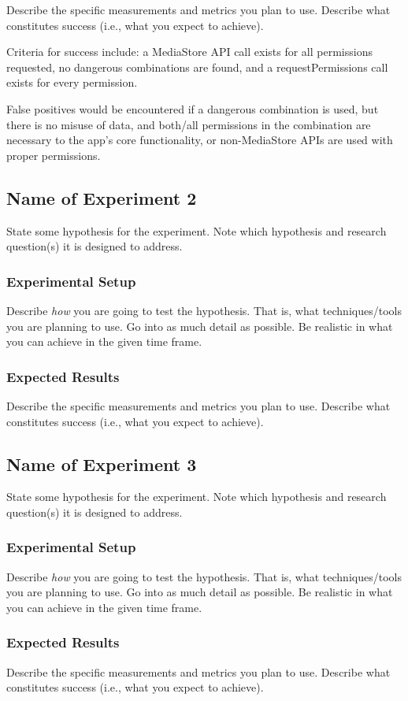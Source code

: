 \documentclass[10pt,twocolumn,pdftex]{article}
\begin{document}
    Describe the specific measurements and metrics you plan to use. Describe
    what constitutes success (i.e., what you expect to achieve).

    Criteria for success include:
    a MediaStore API call exists for all permissions requested, 
    no dangerous combinations are found, and
    a requestPermissions call exists for every permission.

    False positives would be encountered if 
    a dangerous combination is used, but there is no misuse of data, and both/all permissions in the combination are necessary to the app’s core functionality, or 
    non-MediaStore APIs are used with proper permissions.

\subsection{Name of Experiment 2}

    State some hypothesis for the experiment. Note which hypothesis and
    research question(s) it is designed to address.

    \subsubsection{Experimental Setup}
    Describe {\em how} you are going to test the hypothesis. That is, what
    techniques/tools you are planning to use. Go into as much detail as
    possible. Be realistic in what you can achieve in the given time frame.

    

    \subsubsection{Expected Results}

    Describe the specific measurements and metrics you plan to use. Describe
    what constitutes success (i.e., what you expect to achieve).

\subsection{Name of Experiment 3}

    State some hypothesis for the experiment. Note which hypothesis and
    research question(s) it is designed to address.

    \subsubsection{Experimental Setup}
    Describe {\em how} you are going to test the hypothesis. That is, what
    techniques/tools you are planning to use. Go into as much detail as
    possible. Be realistic in what you can achieve in the given time frame.

    \subsubsection{Expected Results}

    Describe the specific measurements and metrics you plan to use. Describe
    what constitutes success (i.e., what you expect to achieve).



\end{document}
